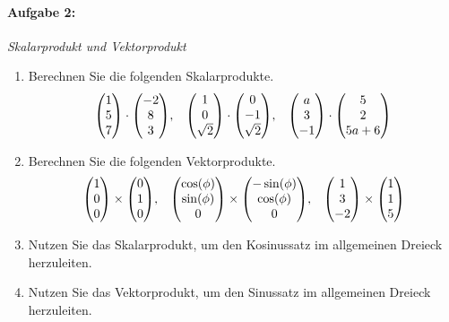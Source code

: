 \paragraph{Aufgabe 2: } \emph{Skalarprodukt und Vektorprodukt}
\begin{enumerate}[label=(\alph*)]
\item Berechnen Sie die folgenden Skalarprodukte.
\begin{align*}
\mqty(1\\5\\7)\cdot\mqty(-2\\8\\3), &&
\mqty(1\\0\\ \sqrt{2})\cdot\mqty(0\\-1\\ \sqrt{2}), &&
\mqty(a\\3\\-1)\cdot\mqty(5\\2\\5a+6)
\end{align*}
\item Berechnen Sie die folgenden Vektorprodukte.
\begin{align*}
\mqty(1\\0\\0 )\times\mqty(0\\1\\0),&&
\mqty(\cos(\phi)\\ \sin(\phi) \\0)\times\mqty(-\sin(\phi)\\ \cos(\phi)\\0),&&
\mqty(1\\3\\-2)\times\mqty(1\\1\\5)
\end{align*}
\item Nutzen Sie das Skalarprodukt, um den Kosinussatz im allgemeinen Dreieck herzuleiten.
\item Nutzen Sie das Vektorprodukt, um den Sinussatz im allgemeinen Dreieck herzuleiten.
\end{enumerate}
%
